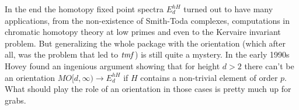 In the end the homotopy fixed point spectra $E_{d}^{hH}$ turned out to
have many applications, from the non-existence of Smith-Toda
complexes, computations in chromatic homotopy theory at low primes and
even to the Kervaire invariant problem.  But generalizing the whole
package with the orientation (which after all, was the problem that
led to $\mathit{tmf}$) is still quite a mystery.  In the early
1990s Hovey found an ingenious argument showing that for height $d>2$
there can't be an orientation $MO[d, \infty) \to E^{hH}_{d}$ if $H$ contains
a non-trivial element of order $p$.  What should play the role of an
orientation in those cases is pretty much up for grabs.

